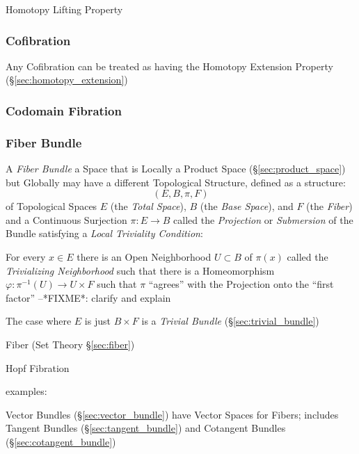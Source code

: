 Homotopy Lifting Property



\subsubsection{Cofibration}\label{sec:cofibration}

Any Cofibration can be treated as having the Homotopy Extension
Property (\S\ref{sec:homotopy_extension})



\subsubsection{Codomain Fibration}\label{sec:codomain_fibration}

\subsubsection{Fiber Bundle}\label{sec:fiber_bundle}

A \emph{Fiber Bundle} a Space that is Locally a Product Space
(\S\ref{sec:product_space}) but Globally may have a different Topological
Structure, defined as a structure:
\[
  (E, B, \pi, F)
\]
of Topological Spaces $E$ (the \emph{Total Space}), $B$ (the \emph{Base
  Space}), and $F$ (the \emph{Fiber}) and a Continuous Surjection $\pi : E
\rightarrow B$ called the \emph{Projection} or \emph{Submersion} of the Bundle
satisfying a \emph{Local Triviality Condition}:

For every $x \in E$ there is an Open Neighborhood $U \subset B$ of $\pi(x)$
called the \emph{Trivializing Neighborhood} such that there is a Homeomorphism
$\varphi : \pi^{-1}(U) \rightarrow U \times F$ such that $\pi$ ``agrees'' with
the Projection onto the ``first factor'' --*FIXME*: clarify and explain

The case where $E$ is just $B \times F$ is a \emph{Trivial Bundle}
(\S\ref{sec:trivial_bundle})

\fist Fiber (Set Theory \S\ref{sec:fiber})

Hopf Fibration

examples:

Vector Bundles (\S\ref{sec:vector_bundle}) have Vector Spaces for Fibers;
includes Tangent Bundles (\S\ref{sec:tangent_bundle}) and Cotangent Bundles
(\S\ref{sec:cotangent_bundle})




